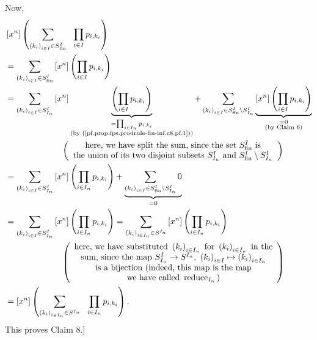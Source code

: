 Now,%
\begin{align*}
&  \left[  x^{n}\right]  \left(  \sum_{\left(  k_{i}\right)  _{i\in I}\in
S_{\operatorname*{fin}}^{I}}\ \ \prod_{i\in I}p_{i,k_{i}}\right) \\
&  =\sum_{\left(  k_{i}\right)  _{i\in I}\in S_{\operatorname*{fin}}^{I}%
}\left[  x^{n}\right]  \left(  \prod_{i\in I}p_{i,k_{i}}\right) \\
&  =\sum_{\left(  k_{i}\right)  _{i\in I}\in S_{I_{n}}^{I}}\left[
x^{n}\right]  \underbrace{\left(  \prod_{i\in I}p_{i,k_{i}}\right)
}_{\substack{=\prod_{i\in I_{n}}p_{i,k_{i}}\\\text{(by
(\ref{pf.prop.fps.prodrule-fin-inf.c8.pf.1}))}}}+\sum_{\left(  k_{i}\right)
_{i\in I}\in S_{\operatorname*{fin}}^{I}\setminus S_{I_{n}}^{I}}%
\underbrace{\left[  x^{n}\right]  \left(  \prod_{i\in I}p_{i,k_{i}}\right)
}_{\substack{=0\\\text{(by Claim 6)}}}\\
&  \ \ \ \ \ \ \ \ \ \ \ \ \ \ \ \ \ \ \ \ \left(
\begin{array}
[c]{c}%
\text{here, we have split the sum, since the set }S_{\operatorname*{fin}}%
^{I}\text{ is}\\
\text{the union of its two disjoint subsets }S_{I_{n}}^{I}\text{ and
}S_{\operatorname*{fin}}^{I}\setminus S_{I_{n}}^{I}%
\end{array}
\right) \\
&  =\sum_{\left(  k_{i}\right)  _{i\in I}\in S_{I_{n}}^{I}}\left[
x^{n}\right]  \left(  \prod_{i\in I_{n}}p_{i,k_{i}}\right)  +\underbrace{\sum
_{\left(  k_{i}\right)  _{i\in I}\in S_{\operatorname*{fin}}^{I}\setminus
S_{I_{n}}^{I}}0}_{=0}\\
&  =\sum_{\left(  k_{i}\right)  _{i\in I}\in S_{I_{n}}^{I}}\left[
x^{n}\right]  \left(  \prod_{i\in I_{n}}p_{i,k_{i}}\right)  =\sum_{\left(
k_{i}\right)  _{i\in I_{n}}\in S^{I_{n}}}\left[  x^{n}\right]  \left(
\prod_{i\in I_{n}}p_{i,k_{i}}\right) \\
&  \ \ \ \ \ \ \ \ \ \ \ \ \ \ \ \ \ \ \ \ \left(
\begin{array}
[c]{c}%
\text{here, we have substituted }\left(  k_{i}\right)  _{i\in I_{n}}\text{ for
}\left(  k_{i}\right)  _{i\in I_{n}}\text{ in the}\\
\text{sum, since the map }S_{I_{n}}^{I}\rightarrow S^{I_{n}},\ \left(
k_{i}\right)  _{i\in I}\mapsto\left(  k_{i}\right)  _{i\in I_{n}}\\
\text{is a bijection (indeed, this map is the map}\\
\text{we have called }\operatorname*{reduce}\nolimits_{I_{n}}\text{)}%
\end{array}
\right) \\
&  =\left[  x^{n}\right]  \left(  \sum_{\left(  k_{i}\right)  _{i\in I_{n}}\in
S^{I_{n}}}\ \ \prod_{i\in I_{n}}p_{i,k_{i}}\right)  .
\end{align*}
This proves Claim 8.]

